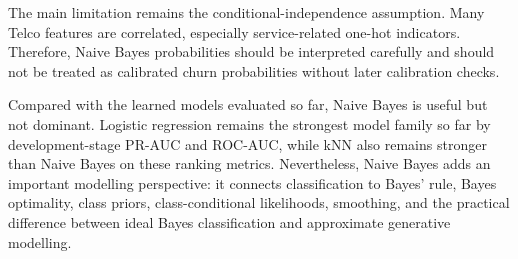 The main limitation remains the conditional-independence assumption. Many Telco features are correlated, especially service-related one-hot indicators. Therefore, Naive Bayes probabilities should be interpreted carefully and should not be treated as calibrated churn probabilities without later calibration checks.

Compared with the learned models evaluated so far, Naive Bayes is useful but not dominant. Logistic regression remains the strongest model family so far by development-stage PR-AUC and ROC-AUC, while kNN also remains stronger than Naive Bayes on these ranking metrics. Nevertheless, Naive Bayes adds an important modelling perspective: it connects classification to Bayes' rule, Bayes optimality, class priors, class-conditional likelihoods, smoothing, and the practical difference between ideal Bayes classification and approximate generative modelling.
